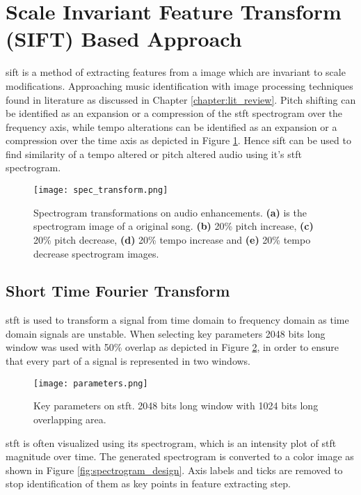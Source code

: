 \section{Scale Invariant Feature Transform (SIFT) Based Approach}

\ac{sift} is a method of extracting features from a image which are invariant 
to scale modifications\cite{Lowe2004}. Approaching music identification with
image processing techniques found in literature as discussed in Chapter \ref{chapter:lit_review}.
Pitch shifting can be identified as an expansion or a compression of the \ac{stft}
spectrogram over the frequency axis, while tempo alterations can be identified 
as an expansion or a compression over the time axis as depicted in Figure \ref{fig:compare_spectrogram_design}.
Hence \ac{sift} can be used to find similarity of a tempo altered or pitch altered audio
using it's \ac{stft} spectrogram. 

\begin{figure}[h]
    \centering
    \texttt{[image: spec\_transform.png]}
    \caption{Spectrogram transformations on audio enhancements. \textbf{(a)} is the spectrogram image of a original song. \textbf{(b)} 20\% 
    pitch increase, \textbf{(c)} 20\% pitch decrease, \textbf{(d)} 20\% tempo increase and \textbf{(e)} 20\% tempo decrease spectrogram images.}
    \label{fig:compare_spectrogram_design}
  \end{figure}

\subsection{Short Time Fourier Transform}

\ac{stft}\cite{Kehtarnavaz2008} is used to transform a signal from time domain to frequency domain as time domain signals
are unstable. When selecting key parameters 2048 bits long window was used with 50\% overlap as depicted in Figure 
\ref{fig:spectrogram_parameters}, in order to ensure that every part of a signal is represented in two windows.

\begin{figure}[H]
    \centering
    \texttt{[image: parameters.png]}
    \caption{Key parameters on \ac{stft}. 2048 bits long window with 1024 bits long overlapping area.}
    \label{fig:spectrogram_parameters}
  \end{figure}

  \ac{stft} is often visualized using its spectrogram\cite{Kehtarnavaz2008}, which is an intensity plot of \ac{stft} magnitude over time. 
  The generated spectrogram is converted to a color image as shown in Figure \ref{fig:spectrogram_design}. Axis labels and ticks are removed to stop
  identification of them as key points in feature extracting step. 

